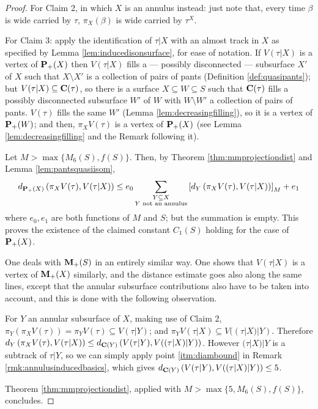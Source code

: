 \begin{proof}
For Claim 2, in which $X$ is an annulus instead: just note that, every time $\beta$ is wide carried by $\tau$, $\pi_X(\beta)$ is wide carried by $\tau^X$. 

For Claim 3: apply the identification of $\tau|X$ with an almost track in $X$ as specified by Lemma \ref{lem:inducedisonsurface}, for ease of notation. If $V(\tau|X)$ is a vertex of ${\mathbf{P}_+}(X)$ then $V(\tau|X)$ fills a --- possibly disconnected --- subsurface $X'$ of $X$ such that $X\setminus X'$ is a collection of pairs of pants (Definition \ref{def:quasipants}); but $V(\tau|X)\subseteq \mathbf C(\tau)$, so there is a surface $X\subseteq W\subseteq S$ such that $\mathbf C(\tau)$ fills a possibly disconnected subsurface $W'$ of $W$ with $W\setminus W'$ a collection of pairs of pants. $V(\tau)$ fills the same $W'$ (Lemma \ref{lem:decreasingfilling}), so it is a vertex of ${\mathbf{P}_+}(W)$; and then, $\pi_X V(\tau)$ is a vertex of ${\mathbf{P}_+}(X)$ (see Lemma \ref{lem:decreasingfilling} and the Remark following it).

Let $M> \max\{M_6(S),f(S)\}$. Then, by Theorem \ref{thm:mmprojectiondist} and Lemma \ref{lem:pantsquasiisom},
$$
d_{{\mathbf{P}_+}(X)}\left(\pi_X V(\tau),V(\tau|X)\right)\leq 
e_0 \sum_{\substack{Y\subseteq X\\ Y\text{ not an annulus}}} \left[d_Y\left(\pi_X V(\tau), V(\tau|X)\right)\right]_M + e_1
$$
where $e_0,e_1$ are both functions of $M$ and $S$; but the summation is empty. This proves the existence of the claimed constant $C_1(S)$ holding for the case of ${\mathbf{P}_+}(X)$.

One deals with ${\mathbf{M}_+}(S)$ in an entirely similar way. One shows that $V(\tau|X)$ is a vertex of ${\mathbf{M}_+}(X)$ similarly, and the distance estimate goes also along the same lines, except that the annular subsurface contributions also have to be taken into account, and this is done with the following observation.

For $Y$ an annular subsurface of $X$, making use of Claim 2, $\pi_Y\left(\pi_X V(\tau)\right)=\pi_Y V(\tau) \subseteq V(\tau|Y)$; and $\pi_Y V(\tau|X)\subseteq V((\tau|X)|Y)$. Therefore $d_Y\left(\pi_X V(\tau), V(\tau|X)\right)\leq d_{\mathbf C(Y)} \left( V(\tau|Y), V((\tau|X)|Y)\right)$. However $(\tau|X)|Y$ is a subtrack of $\tau|Y$, so we can simply apply point \ref{itm:diambound} in Remark \ref{rmk:annulusinducedbasics}, which gives $d_{\mathbf C(Y)} \left( V(\tau|Y), V((\tau|X)|Y)\right)\leq 5$.

Theorem \ref{thm:mmprojectiondist}, applied with $M> \max\{5,M_6(S),f(S)\}$, concludes.
\end{proof}

